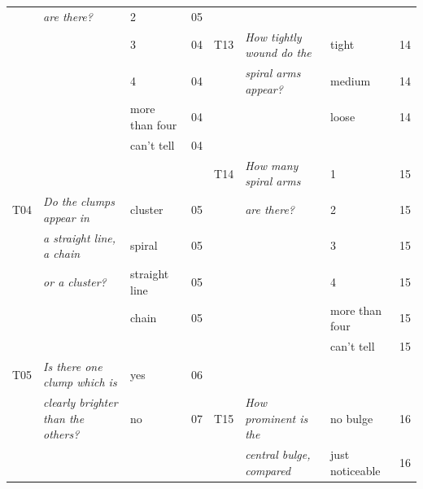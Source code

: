 \documentclass[useAMS,usenatbib]{mn2e}
\begin{document}
{\begin{table}
\begin{tabular}{@{}cllr|cllr}
     & {\it are there?                        } & 2                 & 05         &       &                                       &                  &    \\
     & {\it                                   } & 3                 & 04         &  T13  & {\it How tightly wound do the      }  & tight            & 14 \\
     & {\it                                   } & 4                 & 04         &       & {\it spiral arms appear?           }  & medium           & 14 \\
     & {\it                                   } & more than four    & 04         &       & {\it                               }  & loose            & 14 \\
     & {\it                                   } & can't tell        & 04         &       &                                       &                  &    \\
     &                                          &                   &            &  T14  & {\it How many spiral arms          }  & 1                & 15 \\
T04  & {\it Do the clumps appear in           } & cluster           & 05         &       & {\it are there?                    }  & 2                & 15 \\
     & {\it a straight line, a chain          } & spiral            & 05         &       & {\it                               }  & 3                & 15 \\
     & {\it or a cluster?                     } & straight line     & 05         &       & {\it                               }  & 4                & 15 \\
     & {\it                                   } & chain             & 05         &       & {\it                               }  & more than four   & 15 \\
     &                                          &                   &            &       & {\it                               }  & can't tell       & 15 \\
T05  & {\it Is there one clump which is       } & yes               & 06         &       &                                       &                  &    \\
     & {\it clearly brighter than the others? } & no                & 07         &  T15  & {\it How prominent is the          }  & no bulge         & 16 \\
     &                                          &                   &            &       & {\it central bulge, compared       }  & just noticeable  & 16 \\

\end{tabular}
\end{table}}
\end{document}
